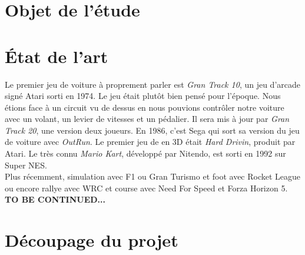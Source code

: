 \documentclass[11pt,a4paper]{article}
\begin{document}
\section{Objet de l'étude}

\clearpage

\section{État de l'art}
Le premier jeu de voiture à proprement parler est \textit{Gran Track 10}, un jeu d'arcade signé Atari 
sorti en 1974. Le jeu était plutôt bien pensé pour l'époque. Nous étions face à un 
circuit vu de dessus en nous pouvions contrôler notre voiture avec un volant, un levier de vitesses
et un pédalier. Il sera mis à jour par \textit{Gran Track 20}, une version deux joueurs.
En 1986, c'est Sega qui sort sa version du jeu de voiture avec \textit{OutRun}. Le premier 
jeu de en 3D était \textit{Hard Drivin}, produit par Atari. Le très connu \textit{Mario Kart},
développé par Nitendo, est sorti en 1992 sur Super NES.\\
\indent Plus récemment, simulation avec F1 ou Gran Turismo et foot avec Rocket League ou encore 
rallye avec WRC et course avec Need For Speed et Forza Horizon 5.\\
\textbf{TO BE CONTINUED...}
\clearpage

\section{Découpage du projet}
\end{document}
